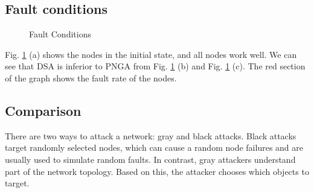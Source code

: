 \documentclass[AMA,STIX1COL]{WileyNJD-v2}
\begin{document}
\subsection{Fault conditions}
\begin{figure}[htbp]
\centering                                                          %
\caption{Fault Conditions} %
\label{conditions}
\end{figure}
\par Fig. \ref{conditions} (a) shows the nodes in the initial state, and all nodes work well. We can see that DSA is inferior to PNGA from Fig. \ref{conditions} (b) and Fig. \ref{conditions} (c). The red section of the graph shows the fault rate of the nodes.


\subsection{Comparison}
\par There are two ways to attack a network: gray and black attacks. Black attacks target randomly selected nodes, which can cause a random node failures and are usually used to simulate random faults. In contrast, gray attackers understand part of the network topology. Based on this, the attacker chooses which objects to target.
\end{document}
